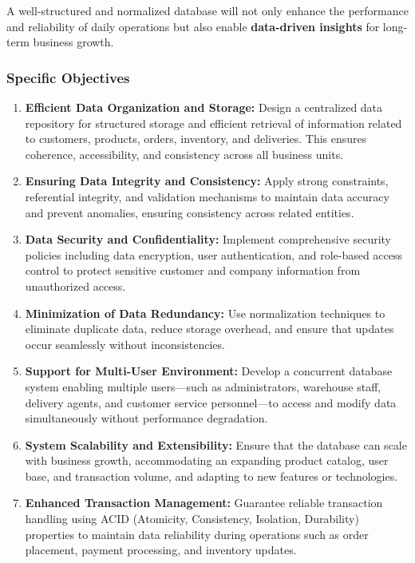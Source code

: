 \documentclass[12pt,a4paper]{article}
\begin{document}
A well-structured and normalized database will not only enhance the performance and reliability of daily operations but also enable \textbf{data-driven insights} for long-term business growth.

\subsubsection{Specific Objectives}

\begin{enumerate}
    \item \textbf{Efficient Data Organization and Storage:} Design a centralized data repository for structured storage and efficient retrieval of information related to customers, products, orders, inventory, and deliveries. This ensures coherence, accessibility, and consistency across all business units.

    \item \textbf{Ensuring Data Integrity and Consistency:} Apply strong constraints, referential integrity, and validation mechanisms to maintain data accuracy and prevent anomalies, ensuring consistency across related entities.

    \item \textbf{Data Security and Confidentiality:} Implement comprehensive security policies including data encryption, user authentication, and role-based access control to protect sensitive customer and company information from unauthorized access.

    \item \textbf{Minimization of Data Redundancy:} Use normalization techniques to eliminate duplicate data, reduce storage overhead, and ensure that updates occur seamlessly without inconsistencies.

    \item \textbf{Support for Multi-User Environment:} Develop a concurrent database system enabling multiple users—such as administrators, warehouse staff, delivery agents, and customer service personnel—to access and modify data simultaneously without performance degradation.

    \item \textbf{System Scalability and Extensibility:} Ensure that the database can scale with business growth, accommodating an expanding product catalog, user base, and transaction volume, and adapting to new features or technologies.

    \item \textbf{Enhanced Transaction Management:} Guarantee reliable transaction handling using ACID (Atomicity, Consistency, Isolation, Durability) properties to maintain data reliability during operations such as order placement, payment processing, and inventory updates.


\end{enumerate}
\end{document}
